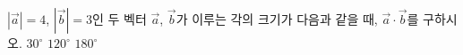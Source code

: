 $|\vec{a}|=4$, $|\vec{b}|=3$인 두 벡터 $\vec{a}$, $\vec{b}$가 이루는 각의 크기가 다음과 같을 때, $\vec{a}\cdot\vec{b}$를 구하시오.
 $30^\circ$
 $120^\circ$
 $180^\circ$
